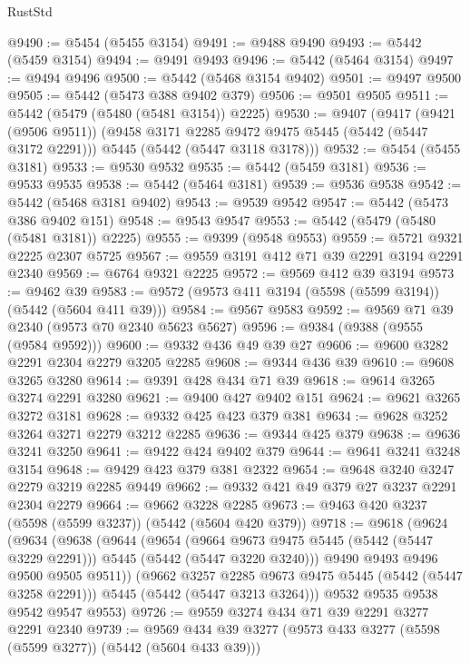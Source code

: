 \begin{lexlean}{RustStd}
\begin{coremodule}
@9490 := @5454 (@5455 @3154)
@9491 := @9488 @9490
@9493 := @5442 (@5459 @3154)
@9494 := @9491 @9493
@9496 := @5442 (@5464 @3154)
@9497 := @9494 @9496
@9500 := @5442 (@5468 @3154 @9402)
@9501 := @9497 @9500
@9505 := @5442 (@5473 @388 @9402 @379)
@9506 := @9501 @9505
@9511 := @5442 (@5479 (@5480 (@5481 @3154)) @2225)
@9530 := @9407
    (@9417
      (@9421 (@9506 @9511))
      (@9458 @3171 @2285 @9472 @9475 @5445 (@5442 (@5447 @3172 @2291)))
      @5445
      (@5442 (@5447 @3118 @3178)))
@9532 := @5454 (@5455 @3181)
@9533 := @9530 @9532
@9535 := @5442 (@5459 @3181)
@9536 := @9533 @9535
@9538 := @5442 (@5464 @3181)
@9539 := @9536 @9538
@9542 := @5442 (@5468 @3181 @9402)
@9543 := @9539 @9542
@9547 := @5442 (@5473 @386 @9402 @151)
@9548 := @9543 @9547
@9553 := @5442 (@5479 (@5480 (@5481 @3181)) @2225)
@9555 := @9399 (@9548 @9553)
@9559 := @5721 @9321 @2225 @2307 @5725
@9567 := @9559 @3191 @412 @71 @39 @2291 @3194 @2291 @2340
@9569 := @6764 @9321 @2225
@9572 := @9569 @412 @39 @3194
@9573 := @9462 @39
@9583 := @9572 (@9573 @411 @3194 (@5598 (@5599 @3194)) (@5442 (@5604 @411 @39)))
@9584 := @9567 @9583
@9592 := @9569 @71 @39 @2340 (@9573 @70 @2340 @5623 @5627)
@9596 := @9384 (@9388 (@9555 (@9584 @9592)))
@9600 := @9332 @436 @49 @39 @27
@9606 := @9600 @3282 @2291 @2304 @2279 @3205 @2285
@9608 := @9344 @436 @39
@9610 := @9608 @3265 @3280
@9614 := @9391 @428 @434 @71 @39
@9618 := @9614 @3265 @3274 @2291 @3280
@9621 := @9400 @427 @9402 @151
@9624 := @9621 @3265 @3272 @3181
@9628 := @9332 @425 @423 @379 @381
@9634 := @9628 @3252 @3264 @3271 @2279 @3212 @2285
@9636 := @9344 @425 @379
@9638 := @9636 @3241 @3250
@9641 := @9422 @424 @9402 @379
@9644 := @9641 @3241 @3248 @3154
@9648 := @9429 @423 @379 @381 @2322
@9654 := @9648 @3240 @3247 @2279 @3219 @2285 @9449
@9662 := @9332 @421 @49 @379 @27 @3237 @2291 @2304 @2279
@9664 := @9662 @3228 @2285
@9673 := @9463 @420 @3237 (@5598 (@5599 @3237)) (@5442 (@5604 @420 @379))
@9718 := @9618
    (@9624
      (@9634
        (@9638
          (@9644
            (@9654
              (@9664 @9673 @9475 @5445 (@5442 (@5447 @3229 @2291)))
              @5445
              (@5442 (@5447 @3220 @3240)))
            @9490
            @9493
            @9496
            @9500
            @9505
            @9511))
        (@9662 @3257 @2285 @9673 @9475 @5445 (@5442 (@5447 @3258 @2291)))
        @5445
        (@5442 (@5447 @3213 @3264)))
      @9532
      @9535
      @9538
      @9542
      @9547
      @9553)
@9726 := @9559 @3274 @434 @71 @39 @2291 @3277 @2291 @2340
@9739 := @9569 @434 @39 @3277 (@9573 @433 @3277 (@5598 (@5599 @3277)) (@5442 (@5604 @433 @39)))

\end{coremodule}
\end{lexlean}
